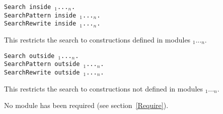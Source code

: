 \begin{Variants}
\item
{\tt Search {\qualid} inside
{\module$_1$}...{\module$_n$}.}\\
{\tt SearchPattern {\term} inside
{\module$_1$}...{\module$_n$}.}\\
{\tt SearchRewrite {\term} inside
{\module$_1$}...{\module$_n$}.}

This restricts the search to constructions defined in modules {\module$_1$}...{\module$_n$}.

\item {\tt Search {\qualid} outside {\module$_1$}...{\module$_n$}.}\\
{\tt SearchPattern {\term} outside {\module$_1$}...{\module$_n$}.}\\
{\tt SearchRewrite {\term} outside {\module$_1$}...{\module$_n$}.}

  This restricts the search to constructions not defined in modules
{\module$_1$}...{\module$_n$}.

\end{Variants}
\begin{ErrMsgs}
\item {}
No module \module{} has been required (see section~\ref{Require}).
\end{ErrMsgs}



